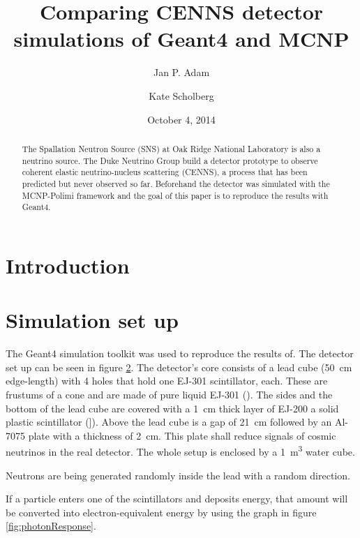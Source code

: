 \documentclass[12pt]{article}
\begin{document}
 

\title{Comparing CENNS detector simulations of Geant4 and MCNP} 

\author[1]{Jan P. Adam} 
\author[2]{Kate Scholberg} 
\date{October 4, 2014} 

\maketitle
\begin{abstract}
The Spallation Neutron Source (SNS) at Oak Ridge National Laboratory is also a neutrino source. The Duke Neutrino Group build a detector prototype to observe coherent elastic neutrino-nucleus scattering (CENNS), a process that has been predicted but never observed so far. Beforehand the detector was simulated with the MCNP-Polimi framework and the goal of this paper is to reproduce the results with Geant4.
\end{abstract}
\newpage

\section{Introduction}



\section{Simulation set up}

The Geant4 simulation toolkit was used to reproduce the results of. The detector set up can be seen in figure \ref{}. The detector's core consists of a lead cube (\SI{50}{cm} edge-length) with 4 holes that hold one EJ-301 scintillator, each. These are frustums of a cone and are made of pure liquid EJ-301 (). The sides and the bottom of the lead cube are covered with a \SI{1}{cm} thick layer of EJ-200 a solid plastic scintillator (]). Above the lead cube is a gap of \SI{21}{cm} followed by an Al-7075 plate with a thickness of \SI{2}{cm}. This plate shall reduce signals of cosmic neutrinos in the real detector. The whole setup is enclosed by a \SI{1}{m^3} water cube.

Neutrons are being generated randomly inside the lead with a random direction.

If a particle enters one of the scintillators and deposits energy, that amount will be converted into electron-equivalent energy by using the graph in figure \ref{fig:photonResponse}.
\end{document}
